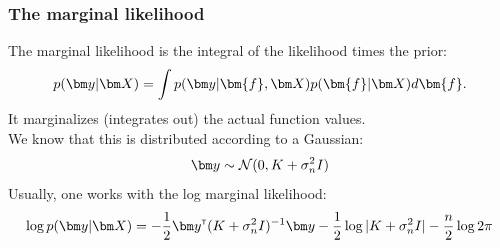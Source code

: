 \begin{frame}
\frametitle{The marginal likelihood}
The marginal likelihood is the integral of the likelihood times the prior:
%
\renewcommand\theequation{2.\thedefcounter}
\setcounter{defcounter}{28}
\begin{equation}
p(\by | \bX) = \int{p(\by | \bm{f}, \bX) p(\bm{f}| \bX) d\bm{f}}.
\end{equation}
%
It marginalizes (integrates out) the actual function values. \\
We know that this is distributed according to a Gaussian:
\begin{equation*}
\by \sim \norm(0, K + \sigma_n^2 I)
\end{equation*}
%
Usually, one works with the log marginal likelihood:
%
\scriptsize
\renewcommand\theequation{2.\thedefcounter}
\setcounter{defcounter}{30}
\begin{equation}
\log p(\by | \bX) = - \frac{1}{2} \by\transpose (K + \sigma_n^2 I) \inv \by - \frac{1}{2} \log |K +
\sigma_n^2 I | - \frac{n}{2} \log 2 \pi
\end{equation}
\normalsize
\end{frame}

